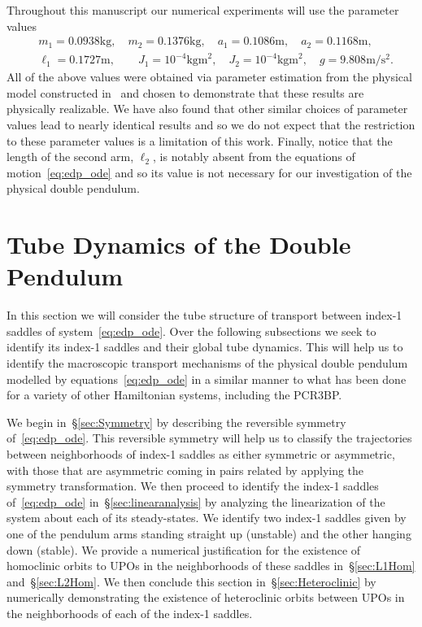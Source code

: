 \documentclass[11pt]{article}
\numberwithin{equation}{section}
\theoremstyle{plain}
\begin{document}
Throughout this manuscript our numerical experiments will use the parameter values
\begin{equation}\label{ParamVals} %
	\begin{split}
		&m_1 = 0.0938\mathrm{kg}, \quad m_2 = 0.1376\mathrm{kg}, \quad a_1 = 0.1086\mathrm{m}, \quad a_2 = 0.1168\mathrm{m}, \\
		&\ell_1= 0.1727\mathrm{m}, \quad \quad J_1 = 10^{-4}\mathrm{kgm}^2, \quad J_2 = 10^{-4}\mathrm{kgm}^2, \quad g = 9.808\mathrm{m}/\mathrm{s}^2.
	\end{split}
\end{equation}
All of the above values were obtained via parameter estimation from the physical model constructed in~\cite{kaheman2022experimental} and chosen to demonstrate that these results are physically realizable. We have also found that other similar choices of parameter values lead to nearly identical results and so we do not expect that the restriction to these parameter values is a limitation of this work. Finally, notice that the length of the second arm, $\ell_2$, is notably absent from the equations of motion~\eqref{eq:edp_ode} and so its value is not necessary for our investigation of the physical double pendulum. 



\section{Tube Dynamics of the Double Pendulum}\label{sec:TubesDP}

In this section we will consider the tube structure of transport between index-1 saddles of system~\eqref{eq:edp_ode}. Over the following subsections we seek to identify its index-1 saddles and their global tube dynamics. This will help us to identify the macroscopic transport mechanisms of the physical double pendulum modelled by equations~\eqref{eq:edp_ode} in a similar manner to what has been done for a variety of other Hamiltonian systems, including the PCR3BP. 

We begin in~\S\ref{sec:Symmetry} by describing the reversible symmetry of~\eqref{eq:edp_ode}. This reversible symmetry will help us to classify the trajectories between neighborhoods of index-1 saddles as either symmetric or asymmetric, with those that are asymmetric coming in pairs related by applying the symmetry transformation. We then proceed to identify the index-1 saddles of~\eqref{eq:edp_ode} in~\S\ref{sec:linearanalysis} by analyzing the linearization of the system about each of its steady-states. We identify two index-1 saddles given by one of the pendulum arms standing straight up (unstable) and the other hanging down (stable). We provide a numerical justification for the existence of homoclinic orbits to UPOs in the neighborhoods of these saddles in~\S\ref{sec:L1Hom} and~\S\ref{sec:L2Hom}. We then conclude this section in~\S\ref{sec:Heteroclinic} by numerically demonstrating the existence of heteroclinic orbits between UPOs in the neighborhoods of each of the index-1 saddles.
\end{document}
